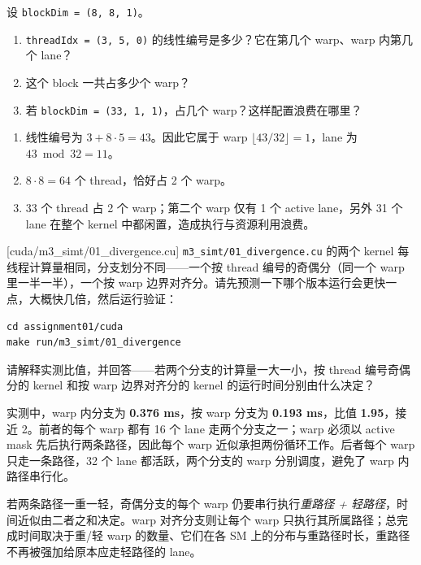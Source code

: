 \documentclass[11pt,a4paper,fontset=none]{ctexart}
\begin{document}
设 \texttt{blockDim = (8, 8, 1)}。
\begin{enumerate}[label=(\alph*)]
  \item \texttt{threadIdx = (3, 5, 0)} 的线性编号是多少？它在第几个 warp、warp 内第几个 lane？
  \item 这个 block 一共占多少个 warp？
  \item 若 \texttt{blockDim = (33, 1, 1)}，占几个 warp？这样配置浪费在哪里？
\end{enumerate}

\begin{answer}
\begin{enumerate}[label=(\alph*)]
  \item 线性编号为 $3 + 8 \cdot 5 = 43$。因此它属于 warp $\lfloor 43 / 32 \rfloor = 1$，lane 为 $43 \bmod 32 = 11$。
  \item $8 \cdot 8 = 64$ 个 thread，恰好占 2 个 warp。
  \item 33 个 thread 占 2 个 warp；第二个 warp 仅有 1 个 active lane，另外 31 个 lane 在整个 kernel 中都闲置，造成执行与资源利用浪费。
\end{enumerate}
\end{answer}

[cuda/m3\_simt/01\_divergence.cu]
\texttt{m3\_simt/01\_divergence.cu} 的两个 kernel 每线程计算量相同，分支划分不同——一个按 thread 编号的奇偶分（同一个 warp 里一半一半），一个按 warp 边界对齐分。请先预测一下哪个版本运行会更快一点，大概快几倍，然后运行验证：

\begin{lstlisting}
cd assignment01/cuda
make run/m3_simt/01_divergence
\end{lstlisting}

请解释实测比值，并回答——若两个分支的计算量一大一小，按 thread 编号奇偶分的 kernel 和按 warp 边界对齐分的 kernel 的运行时间分别由什么决定？

\begin{answer}
实测中，warp 内分支为 \textbf{0.376 ms}，按 warp 分支为 \textbf{0.193 ms}，比值 \textbf{1.95}，接近 2。前者的每个 warp 都有 16 个 lane 走两个分支之一；warp 必须以 active mask 先后执行两条路径，因此每个 warp 近似承担两份循环工作。后者每个 warp 只走一条路径，32 个 lane 都活跃，两个分支的 warp 分别调度，避免了 warp 内路径串行化。

若两条路径一重一轻，奇偶分支的每个 warp 仍要串行执行\emph{重路径 + 轻路径}，时间近似由二者之和决定。warp 对齐分支则让每个 warp 只执行其所属路径；总完成时间取决于重/轻 warp 的数量、它们在各 SM 上的分布与重路径时长，重路径不再被强加给原本应走轻路径的 lane。
\end{answer}
\end{document}
